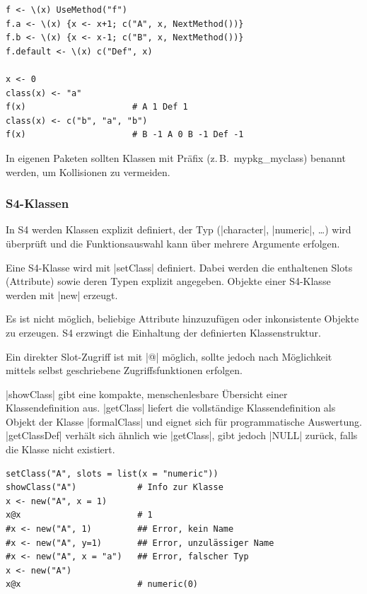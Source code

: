 \documentclass[10pt,twocolumn]{scrartcl}
\renewcommand{\lstinline}{\mycoloredinline}
\begin{document}
\begin{lstlisting}
f <- \(x) UseMethod("f")
f.a <- \(x) {x <- x+1; c("A", x, NextMethod())}
f.b <- \(x) {x <- x-1; c("B", x, NextMethod())}
f.default <- \(x) c("Def", x)

x <- 0
class(x) <- "a"
f(x)                     # A 1 Def 1
class(x) <- c("b", "a", "b")
f(x)                     # B -1 A 0 B -1 Def -1
\end{lstlisting}

In eigenen Paketen sollten Klassen mit Präfix (z.\,B.\ mypkg\_myclass) benannt werden, um Kollisionen zu vermeiden.


\subsubsection{S4-Klassen}

In S4 werden Klassen explizit definiert, der Typ (\lstinline|character|, \lstinline|numeric|, \dots) wird überprüft und die Funktionsauswahl kann über mehrere Argumente erfolgen.

Eine S4-Klasse wird mit \lstinline|setClass| definiert. Dabei werden die enthaltenen Slots (Attribute) sowie deren Typen explizit angegeben. Objekte einer S4-Klasse werden mit \lstinline|new| erzeugt.

Es ist nicht möglich, beliebige Attribute hinzuzufügen oder inkonsistente Objekte zu erzeugen. S4 erzwingt die Einhaltung der definierten Klassenstruktur.

Ein direkter Slot-Zugriff ist mit \lstinline|@| möglich, sollte jedoch nach Möglichkeit mittels selbst geschriebene Zugriffsfunktionen erfolgen.

\lstinline|showClass| gibt eine kompakte, menschenlesbare Übersicht einer Klassendefinition aus.
\lstinline|getClass| liefert die vollständige Klassendefinition als Objekt der Klasse \lstinline|formalClass| und eignet sich für programmatische Auswertung.
\lstinline|getClassDef| verhält sich ähnlich wie \lstinline|getClass|, gibt jedoch \lstinline|NULL| zurück, falls die Klasse nicht existiert.

\begin{lstlisting}
setClass("A", slots = list(x = "numeric"))
showClass("A")            # Info zur Klasse
x <- new("A", x = 1)
x@x                       # 1
#x <- new("A", 1)         ## Error, kein Name
#x <- new("A", y=1)       ## Error, unzulässiger Name
#x <- new("A", x = "a")   ## Error, falscher Typ
x <- new("A")
x@x                       # numeric(0)
\end{lstlisting}
\end{document}
